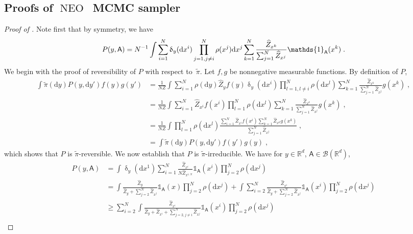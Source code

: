 \documentclass{article}
\def\IFIS{\ensuremath{\operatorname{NEO}}}
\def\InFiNE{{\small \IFIS}}
\def\rmd{\operatorname{d}\hspace{-2pt}}
\def\rset{\mathbb{R}}
\def\rmd{\mathrm{d}}
\def\eqsp{\,}
\def\msa{\mathsf{A}}
\def\wrt{w.r.t.}
\def\eqsp{\;}
\newcommand{\1}{\mathds{1}}
\newcommand{\indi}[1]{\1_{#1}}
\def\proposal{\rho}
\newcommand{\chunku}[3]{#1^{#2:#3}}
\def\const{Z}
\newcommand{\estConstC}[1]{\widehat{Z}_{#1}}
\def\tpi{\tilde{\pi}}
\def\msa{\mathsf{A}}
\def\mcbb{\mathcal{B}}  %
\newcommand{\mcb}[1]{\mathcal{B}(#1)}
\def\rset{\mathbb{R}}
\def\rmd{\mathrm{d}}
\def\wrt{with respect to}
\begin{document}
\subsection{Proofs of \InFiNE\ MCMC sampler}
\label{sec:supp:proof_mcmc}


\begin{proof}[Proof of ]
Note first that by symmetry, we have
\begin{equation}
\label{eq:symmetrized_P}
   P(y, \msa) = N^{-1}\int\sum_{i=1}^N \updelta_{y}(\rmd x^i) \prod_{j=1,\\j\neq i}^N\rho(x^j)\rmd x^j \sum_{k=1}^N\frac{\estConstC{x^k}}{\sum_{j=1}^N \estConstC{x^j}}\indi{\msa}(x^k)\eqsp.
\end{equation}
We begin with the proof of reversibility of $P$ \wrt\ $\tpi$.
Let $f,g$ be nonnegative measurable functions. By definition of $P$,
\begin{align*}
\int \tpi(\rmd y) P(y, \rmd y') f(y) g(y') &= \frac{1}{N\const}\int \sum_{i=1}^N \proposal(\rmd y) \estConstC{y} f(y) \updelta_y(\rmd x^i) \prod_{l=1, l\neq i}^N \proposal(\rmd x^l) \sum_{k=1}^N \frac{\estConstC{x^k}}{\sum_{j=1}^N\estConstC{x^j}} g(x^k)\eqsp,\\
&= \frac{1}{N\const}\int \sum_{i=1}^N  \estConstC{x^i} f(x^i)  \prod_{l=1}^N \proposal(\rmd x^l) \sum_{k=1}^N \frac{\estConstC{x^k}}{\sum_{j=1}^N\estConstC{x^j}} g(x^k)\eqsp,\\
&= \frac{1}{N\const}\int   \prod_{l=1}^N \proposal(\rmd x^l)  \frac{  \sum_{i=1}^N\estConstC{x^i} f(x^i) \sum_{k=1}^N\estConstC{x^k}g(x^k)}{\sum_{j=1}^N\estConstC{x^j}}\eqsp, \\
&= \int \tpi(\rmd y) P(y, \rmd y') f(y') g(y)\eqsp,
\end{align*}
which shows that $P$ is $\tpi$-reversible. We now establish that $P$ is $\tpi$-irreducible. 
  We have for $y \in \rset^d$, $\msa \in\mcbb(\rset^d)$,
  \begin{align*}
    P(y, \msa) &=\int \updelta_y(\rmd x^1)\sum_{i=1}^N \frac{\estConstC{x^i}}{N\estConstC{\chunku{x}{1}{N}}}\indi{\msa}(x^i) \prod_{j=2}^N\proposal(\rmd x^j) \\
               &=  \int \frac{\estConstC{y}}{\estConstC{y} + \sum_{j=2}^N \estConstC{x^j}}\indi{\msa}(x) \prod_{j=2}^N\proposal(\rmd x^j) + \int \sum_{i=2}^N \frac{\estConstC{x^i}}{\estConstC{y} + \sum_{j=2}^N \estConstC{x^j}}\indi{\msa}(x^i) \prod_{j=2}^N\proposal(\rmd x^j)\\
               &\geq \sum_{i=2}^N\int  \frac{\estConstC{x^i}}{\estConstC{y} +\estConstC{x^i}+ \sum_{j=2, j\neq i}^N \estConstC{x^j}}\indi{\msa}(x^i) \prod_{j=2}^N\proposal(\rmd x^j)\\

\end{align*}
\end{proof}
\end{document}
